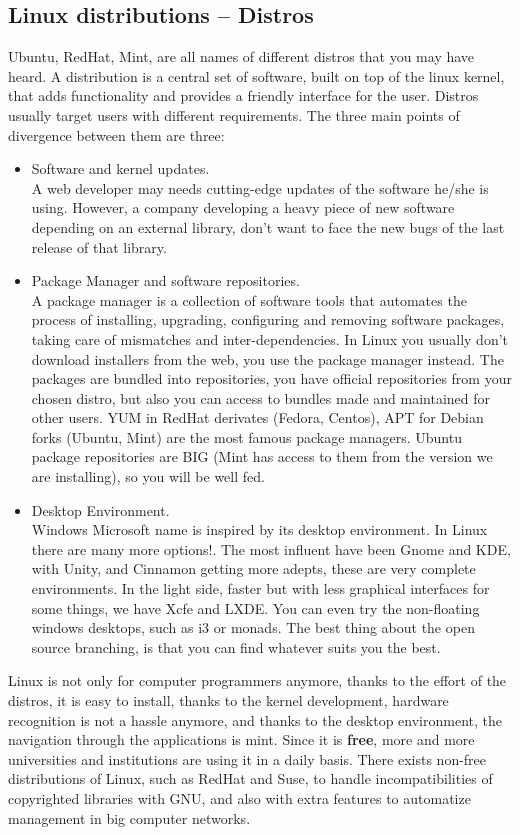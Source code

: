 \documentclass[a4paper]{article}
\begin{document}
\subsection{Linux distributions -- Distros}
Ubuntu, RedHat, Mint, are all names of different distros that you may have heard. A distribution is a central set of software, built on top of the linux kernel, that adds functionality and provides a friendly interface for the user. 
Distros usually target users with different requirements. The three main points of divergence between them are three:
\begin{itemize}
    \item Software and kernel updates.\\ A web developer may needs cutting-edge updates of the software he/she is using. However, a company developing a heavy piece of new software depending on an external library, don't want to face the new bugs of the last release of that library.
    \item Package Manager and software repositories.\\ A package manager is a collection of software tools that automates the process of installing, upgrading, configuring and removing software packages, taking care of mismatches and inter-dependencies. In Linux you usually don't download installers from the web, you use the package manager instead. The packages are bundled into repositories, you have official repositories from your chosen distro, but also you can access to bundles made and maintained for other users. YUM in RedHat derivates (Fedora, Centos), APT for Debian forks (Ubuntu, Mint) are the most famous package managers. Ubuntu package repositories are BIG (Mint has access to them from the version we are installing), so you will be well fed. 
    \item Desktop Environment.\\ Windows Microsoft name is inspired by its desktop environment. In Linux there are many more options!. The most influent have been Gnome and KDE, with Unity, and Cinnamon getting more adepts, these are very complete environments. In the light side, faster but with less graphical interfaces for some things, we have Xcfe and LXDE. You can even try the non-floating windows desktops, such as i3 or monads. The best thing about the open source branching, is that you can find whatever suits you the best.
\end{itemize}

Linux is not only for computer programmers anymore, thanks to the effort of the distros, it is easy to install, thanks to the kernel development, hardware recognition is not a hassle anymore, and thanks to the desktop environment, the navigation through the applications is mint. Since it is \textbf{free}, more and more universities and institutions are using it in a daily basis. There exists non-free distributions of Linux, such as RedHat and Suse, to handle incompatibilities of copyrighted libraries with GNU, and also with extra features to automatize management in big computer networks.\\
\end{document}
